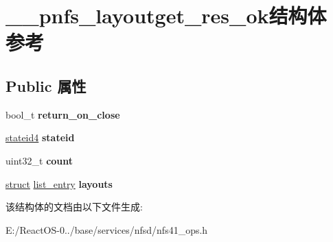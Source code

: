 \hypertarget{struct____pnfs__layoutget__res__ok}{}\section{\+\_\+\+\_\+pnfs\+\_\+layoutget\+\_\+res\+\_\+ok结构体 参考}
\label{struct____pnfs__layoutget__res__ok}
\subsection*{Public 属性}
\begin{DoxyCompactItemize}
\item 
\mbox{\label{struct____pnfs__layoutget__res__ok_a3ef485bc0ff3fb06074850c12dc70c68}} 
bool\+\_\+t {\bfseries return\+\_\+on\+\_\+close}
\item 
\mbox{\label{struct____pnfs__layoutget__res__ok_ac16bb60f8b3455ab8df7a18922be174e}} 
\hyperlink{struct____stateid4}{stateid4} {\bfseries stateid}
\item 
\mbox{\label{struct____pnfs__layoutget__res__ok_ad5a95676609762e46485d0ddc5271c54}} 
uint32\+\_\+t {\bfseries count}
\item 
\mbox{\label{struct____pnfs__layoutget__res__ok_ac35ddd27d60c5f5f166e1af40d7f676f}} 
\hyperlink{interfacestruct}{struct} \hyperlink{structlist__entry}{list\+\_\+entry} {\bfseries layouts}
\end{DoxyCompactItemize}


该结构体的文档由以下文件生成\+:\begin{DoxyCompactItemize}
\item 
E\+:/\+React\+O\+S-\/0../base/services/nfsd/nfs41\+\_\+ops.\+h\end{DoxyCompactItemize}
